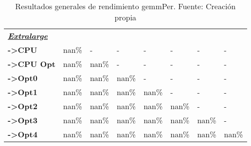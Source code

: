 \begin{table}[H]
\begin{tabular}{llllllll}
    \cellcolor[HTML]{DAE8FC} \textbf{\textbf{{\emph{{\underline{{Extralarge}}}}}}} &  &  &  &  &  &  &  \\
    \rowcolor[HTML]{EFEFEF} \cellcolor[HTML]{DAE8FC} \textbf{->CPU} & nan\% & - & - & - & - & - & - \\
    \cellcolor[HTML]{DAE8FC} \textbf{->CPU Opt} & nan\% & nan\% & - & - & - & - & - \\
    \rowcolor[HTML]{EFEFEF} \cellcolor[HTML]{DAE8FC} \textbf{->Opt0} & nan\% & nan\% & nan\% & - & - & - & - \\
    \cellcolor[HTML]{DAE8FC} \textbf{->Opt1} & nan\% & nan\% & nan\% & nan\% & - & - & - \\
    \rowcolor[HTML]{EFEFEF} \cellcolor[HTML]{DAE8FC} \textbf{->Opt2} & nan\% & nan\% & nan\% & nan\% & nan\% & - & - \\
    \cellcolor[HTML]{DAE8FC} \textbf{->Opt3} & nan\% & nan\% & nan\% & nan\% & nan\% & 	nan\% & - \\
    \rowcolor[HTML]{EFEFEF} \cellcolor[HTML]{DAE8FC} \textbf{->Opt4} & nan\% & nan\% & nan\% & nan\% & nan\% & 	nan\% & 	nan\% \\
    \end{tabular}
    \caption[Resultados generales de rendimiento gemmPer]{{Resultados generales de rendimiento gemmPer. Fuente: Creación propia}}
    \label{table_global_gemmPer_PerformanceResults_speedup}
\end{table}